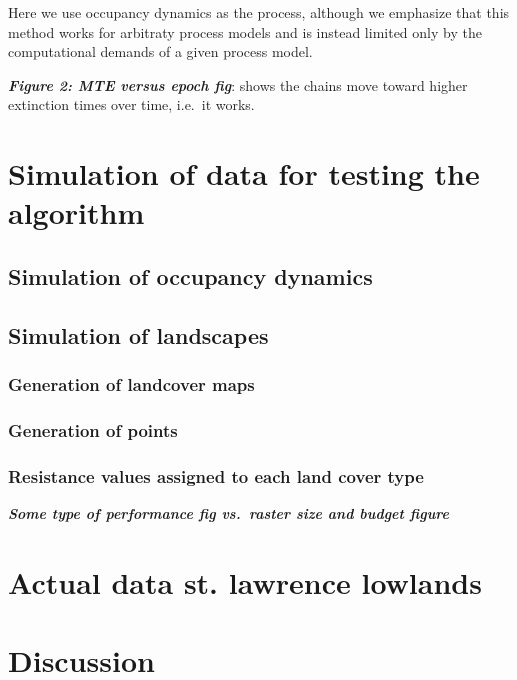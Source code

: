 \documentclass[10pt,oneside]{article}
\begin{document}
Here we use occupancy dynamics as the process, although we emphasize
that this method works for arbitraty process models and is instead
limited only by the computational demands of a given process model.

\textbf{\emph{Figure 2: MTE versus epoch fig}}: shows the chains move
toward higher extinction times over time, i.e.~it works.

\hypertarget{simulation-of-data-for-testing-the-algorithm}{%
\section{Simulation of data for testing the
algorithm}\label{simulation-of-data-for-testing-the-algorithm}}

\hypertarget{simulation-of-occupancy-dynamics}{%
\subsection{Simulation of occupancy
dynamics}\label{simulation-of-occupancy-dynamics}}

\hypertarget{simulation-of-landscapes}{%
\subsection{Simulation of landscapes}\label{simulation-of-landscapes}}

\hypertarget{generation-of-landcover-maps}{%
\subsubsection{Generation of landcover
maps}\label{generation-of-landcover-maps}}

\hypertarget{generation-of-points}{%
\subsubsection{Generation of points}\label{generation-of-points}}

\hypertarget{resistance-values-assigned-to-each-land-cover-type}{%
\subsubsection{Resistance values assigned to each land cover
type}\label{resistance-values-assigned-to-each-land-cover-type}}

\textbf{\emph{Some type of performance fig vs.~raster size and budget
figure}}

\hypertarget{actual-data-st.-lawrence-lowlands}{%
\section{Actual data st. lawrence
lowlands}\label{actual-data-st.-lawrence-lowlands}}

\hypertarget{discussion}{%
\section{Discussion}\label{discussion}}
\end{document}
